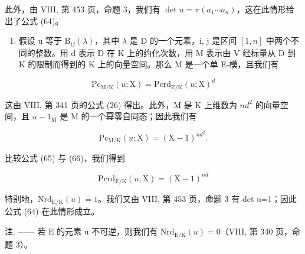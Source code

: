 此外，由 VIII, 第 453 页，命题 3，我们有 \(\det u = \pi(a_{1} \cdots a_{n})\)，这在此情形给出了公式 (64)。

\begin{enumerate}
\def\labelenumi{\Alph{enumi})}
\setcounter{enumi}{1}
\tightlist
\item
  假设 u 等于 \(\mathrm{B}_{ij}(\lambda)\)，其中 \(\lambda\) 是 D 的一个元素，i, j 是区间 \([1,n]\) 中两个不同的整数。用 d 表示 D 在 K 上的约化次数，用 M 表示由 V 经标量从 D 到 K 的限制而得到的 K 上的向量空间。那么 M 是一个单 E-模，且我们有
\end{enumerate}

\[
\mathrm{Pc} _ {\mathrm{M/K}} (u; \mathrm{X}) = \mathrm{Pcrd} _ {\mathrm{E/K}} (u; \mathrm{X}) ^ {d}\tag{65}
\]

这由 VIII, 第 341 页的公式 (26) 得出。此外，M 是 K 上维数为 \(nd^2\) 的向量空间，且 \(u - 1_{\mathrm{M}}\) 是 M 的一个幂零自同态；因此我们有

\[
\mathrm{Pc} _ {\mathrm{M/K}} (u; \mathrm{X}) = (\mathrm{X} - 1) ^ {n d ^ {2}}.\tag{66}
\]

比较公式 (65) 与 (66)，我们得到

\[
\mathrm{Pcrd} _ {\mathrm{E/K}} (u; \mathrm{X}) = (\mathrm{X} - 1) ^ {n d}\tag{67}
\]

特别地，\(\mathrm{Nrd}_{\mathrm{E}/\mathrm{K}}(u)=1\)。我们又由 VIII, 第 453 页，命题 3 有 det u=1；因此公式 (64) 在此情形成立。

注. —— 若 E 的元素 u 不可逆，则我们有 \(\mathrm{Nrd}_{\mathrm{E}/\mathrm{K}}(u)=0\)（VIII, 第 340 页，命题 3）。

